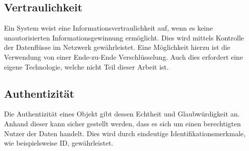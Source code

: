 \subsection{Vertraulichkeit}
Ein System weist eine Informationsvertraulichkeit auf, wenn es keine unautorisierten Informationsgewinnung ermöglicht. Dies wird mittels Kontrolle der Datenflüsse im Netzwerk gewährleistet. Eine Möglichkeit hierzu ist die Verwendung von einer Ende-zu-Ende Verschlüsselung. Auch dies erfordert eine eigene Technologie, welche nicht Teil dieser Arbeit ist.

\subsection{Authentizität}
Die Authentizität eines Objekt gibt dessen Echtheit und Glaubwürdigkeit an. Anhand dieser kann sicher gestellt werden, dass es sich um einen berechtigten Nutzer der Daten handelt. Dies wird durch eindeutige Identifikationsmerkmale, wie beispielsweise \acf{ID}, gewährleistet.